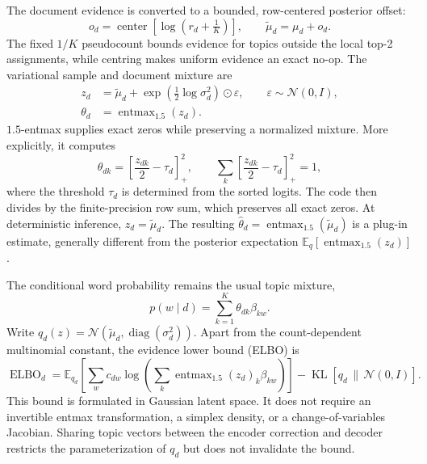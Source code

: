 \documentclass[10pt,a4paper]{article}
\newcommand{\centerop}{\operatorname{center}}
\newcommand{\entmax}{\operatorname{entmax}_{1.5}}
\begin{document}
The document evidence is converted to a bounded, row-centered posterior offset:
\begin{equation}
  o_d=\centerop\!\left[\log\left(r_d+\tfrac1K\right)\right],
  \qquad
  \widetilde\mu_d=\mu_d+o_d.
  \label{eq:posterior-offset}
\end{equation}
The fixed $1/K$ pseudocount bounds evidence for topics outside the local top-2
assignments, while centring makes uniform evidence an exact no-op. The variational sample and
document mixture are
\begin{align}
  z_d&=\widetilde\mu_d+
  \exp\!\left(\tfrac12\log\sigma_d^2\right)\odot\varepsilon,
  \qquad \varepsilon\sim\mathcal N(0,I),\\
  \theta_d&=\entmax(z_d).
  \label{eq:theta}
\end{align}
$1.5$-entmax supplies exact zeros while preserving a normalized mixture. More
explicitly, it computes
\begin{equation}
  \theta_{dk}=\left[\frac{z_{dk}}{2}-\tau_d\right]_+^2,
  \qquad
  \sum_k\left[\frac{z_{dk}}{2}-\tau_d\right]_+^2=1,
  \label{eq:entmax-closed-form}
\end{equation}
where the threshold $\tau_d$ is determined from the sorted logits. The code
then divides by the finite-precision row sum, which preserves all exact zeros.
At deterministic inference, $z_d=\widetilde\mu_d$. The resulting
$\widehat\theta_d=\entmax(\widetilde\mu_d)$ is a plug-in estimate, generally
different from the posterior expectation $\mathbb E_q[\entmax(z_d)]$.

The conditional word probability remains the usual topic mixture,
\begin{equation}
  p(w\mid d)=\sum_{k=1}^K\theta_{dk}\beta_{kw}.
  \label{eq:mixture}
\end{equation}
Write $q_d(z)=\mathcal N(\widetilde\mu_d,
\operatorname{diag}(\sigma_d^2))$. Apart from the count-dependent multinomial
constant, the evidence lower bound (ELBO) is
\begin{equation}
  \operatorname{ELBO}_d
  =\mathbb E_{q_d}\!\left[
    \sum_w c_{dw}\log\!\left(\sum_k\entmax(z_d)_k\beta_{kw}\right)
  \right]-\operatorname{KL}\!\left[q_d\,\|\,\mathcal N(0,I)\right].
  \label{eq:elbo}
\end{equation}
This bound is formulated in Gaussian latent space. It does not require an
invertible entmax transformation, a simplex density, or a change-of-variables
Jacobian. Sharing topic vectors between the encoder correction and decoder
restricts the parameterization of $q_d$ but does not invalidate the bound.
\end{document}
